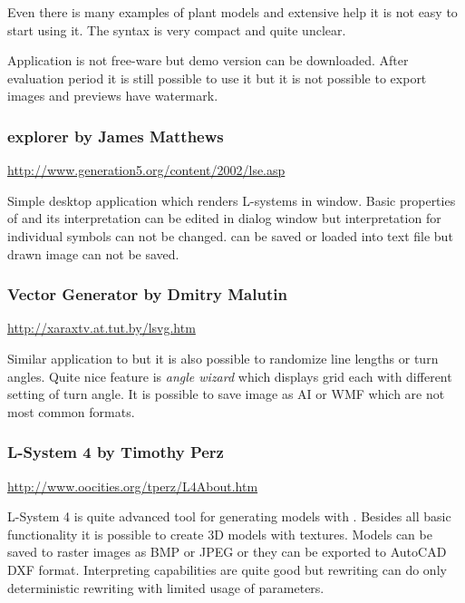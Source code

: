 Even there is many examples of plant models and extensive help it is not easy to start using it.
The syntax is very compact and quite unclear.

Application is not free-ware but demo version can be downloaded.
After evaluation period it is still possible to use it but it is not possible to export images and previews have watermark. 


\subsubsection{\lsystems explorer by James Matthews}
{ \vspace{-10pt} \footnotesize \url{http://www.generation5.org/content/2002/lse.asp} }
\label{sec:LsystemExplorer}

Simple desktop application which renders L-systems in window.
Basic properties of \lsystem and its interpretation can be edited in dialog window but interpretation for individual symbols can not be changed.
\lsystems can be saved or loaded into text file but drawn image can not be saved.


\subsubsection{\lsystem Vector Generator by Dmitry Malutin}
{ \vspace{-10pt} \footnotesize \url{http://xaraxtv.at.tut.by/lsvg.htm} }

Similar application to  but it is also possible to randomize line lengths or turn angles.
Quite nice feature is \emph{angle wizard} which displays grid \lsystems each with different setting of turn angle.
It is possible to save image as AI or WMF which are not most common formats.


\subsubsection{L-System 4 by Timothy Perz}
{ \vspace{-10pt} \footnotesize \url{http://www.oocities.org/tperz/L4About.htm} }

L-System 4 is quite advanced tool for generating models with \lsystems.
Besides all basic functionality it is possible to create 3D models with textures.
Models can be saved to raster images as BMP or JPEG or they can be exported to AutoCAD DXF format.
Interpreting capabilities are quite good but \lsystem rewriting can do only deterministic rewriting with limited usage of parameters.























